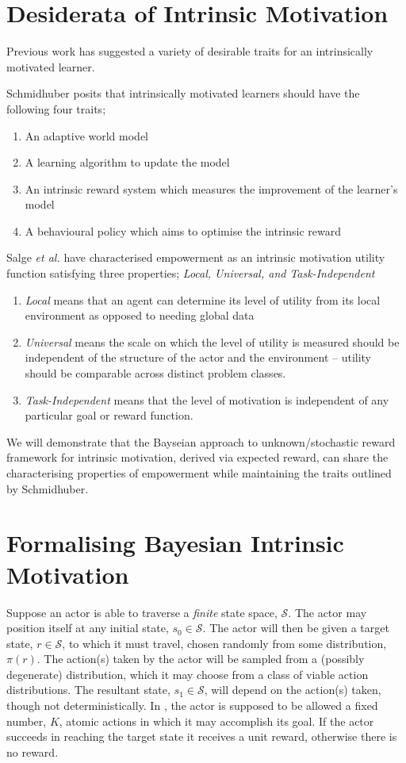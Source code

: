 \documentclass{article}
\newcommand{\Ss}{\mathcal{S}}
\begin{document}
\section{Desiderata of Intrinsic Motivation}
Previous work has suggested a variety of desirable traits for an intrinsically motivated learner.

Schmidhuber \cite{schmidhuber2010formal} posits that intrinsically motivated learners should have the following four traits;
\begin{enumerate}
\item An adaptive world model
\item A learning algorithm to update the model
\item An intrinsic reward system which measures the improvement of the learner's model
\item A behavioural policy which aims to optimise the intrinsic reward
\end{enumerate}

Salge \textit{et al.} \cite{salge2014empowerment} have characterised empowerment as an intrinsic motivation utility function satisfying three properties; \textit{Local, Universal, and Task-Independent}
\begin{enumerate}
\item \textit{Local} means that an agent can determine its level of utility from its local environment as opposed to needing global data\
\item \textit{Universal} means the scale on which the level of utility is measured should be independent of the structure of the actor and the environment -- utility should be comparable across distinct problem classes.
\item \textit{Task-Independent} means that the level of motivation is independent of any particular goal or reward function.
\end{enumerate}

We will demonstrate that the Bayseian approach to unknown/stochastic reward framework for intrinsic motivation, derived via expected reward, can share the characterising properties of empowerment while maintaining the traits outlined by Schmidhuber.  

\section{Formalising Bayesian Intrinsic Motivation}
Suppose an actor is able to traverse a \textit{finite} state space, $\Ss$. 
The actor may position itself at any initial state, $s_0\in \Ss$. 
The actor will then be given a target state, $r\in \Ss$, to which it must travel, chosen randomly from some distribution, $\pi(r)$. 
The action(s) taken by the actor will be sampled from a (possibly degenerate) distribution, which it may choose from a class of viable action distributions. 
The resultant state, $s_1\in\Ss$, will depend on the action(s) taken, though not deterministically.  
In \cite{mohamed2015variational}, the actor is supposed to be allowed a fixed number, $K$, atomic actions in which it may accomplish its goal.
If the actor succeeds in reaching the target state it receives a unit reward, otherwise there is no reward.
\end{document}
